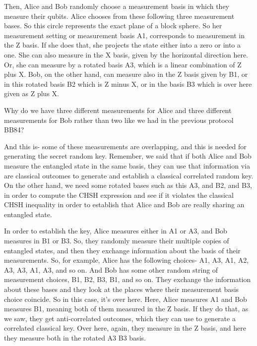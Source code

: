 Then, Alice and Bob randomly choose a measurement basis in which they measure their qubits. Alice chooses from these following three measurement bases. So this circle represents the exact plane of a block sphere. So her measurement setting or measurement basis A1, corresponds to measurement in the Z basis. If she does that, she projects the state either into a zero or into a one. She can also measure in the X basis, given by the horizontal direction here. Or, she can measure by a rotated basis A3, which is a linear combination of Z plus X. Bob, on the other hand, can measure also in the Z basis given by B1, or in this rotated basis B2 which is Z minus X, or in the basis B3 which is over here given as Z plus X.

Why do we have three different measurements for Alice and three different measurements for Bob rather than two like we had in the previous protocol BB84?

And this is- some of these measurements are overlapping, and this is needed for generating the secret random key. Remember, we said that if both Alice and Bob measure the entangled state in the same basis, they can use that information via are classical outcomes to generate and establish a classical correlated random key. On the other hand, we need some rotated bases such as this A3, and B2, and B3, in order to compute the CHSH expression and see if it violates the classical CHSH inequality in order to establish that Alice and Bob are really sharing an entangled state.

In order to establish the key, Alice measures either in A1 or A3, and Bob measures in B1 or B3. So, they randomly measure their multiple copies of entangled states, and then they exchange information about the basis of their measurements. So, for example, Alice has the following choices- A1, A3, A1, A2, A3, A3, A1, A3, and so on. And Bob has some other random string of measurement choices, B1, B2, B3, B1, and so on. They exchange the information about these bases and they look at the places where their measurement basis choice coincide. So in this case, it's over here. Here, Alice measures A1 and Bob measures B1, meaning both of them measured in the Z basis. If they do that, as we saw, they get anti-correlated outcomes, which they can use to generate a correlated classical key. Over here, again, they measure in the Z basis, and here they measure both in the rotated A3 B3 basis.

